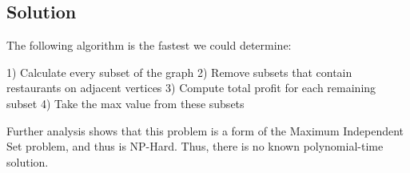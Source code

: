 \subsection*{Solution}

The following algorithm is the fastest we could determine:

1) Calculate every subset of the graph
2) Remove subsets that contain restaurants on adjacent vertices
3) Compute total profit for each remaining subset
4) Take the max value from these subsets

Further analysis shows that this problem is a form of the Maximum Independent Set problem, and thus is NP-Hard. Thus, there is no known polynomial-time solution.
